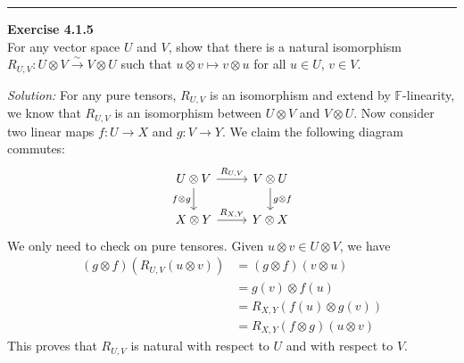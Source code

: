 \documentclass[a4paper, 12pt]{article}
\newenvironment{problem}[2][Exercise]
    { \begin{mdframed}[backgroundcolor=gray!20] \textbf{#1 #2} \\}
    {  \end{mdframed}}
\newenvironment{solution}
    {\textit{Solution:}}
    {}
\begin{document}
\noindent\rule{7in}{2.8pt}
\begin{problem}{4.1.5}
For any vector space \(U\) and \(V\), show that there is a natural isomorphism \(R_{U,V}:U\otimes V\xrightarrow{\sim} V\otimes U\) such that \(u\otimes v\mapsto v\otimes u\) 
for all \(u\in U\), \(v\in V\).
\end{problem}
\begin{solution}
For any pure tensors, \(R_{U,V}\) is an isomorphism and extend by \(\mathbb{F}\)-linearity, we know that \(R_{U,V}\) is an isomorphism between \(U\otimes V\) and \(V\otimes U\). Now consider two linear maps 
\(f:U\rightarrow X\) and \(g:V\rightarrow Y\). We claim the following diagram commutes:
\[\begin{tikzcd}
	{U\otimes V} & {V\otimes U} \\
	{X\otimes Y} & {Y\otimes X}
	\arrow["{R_{U,V}}", from=1-1, to=1-2]
	\arrow["{f\otimes g}"', from=1-1, to=2-1]
	\arrow["{g\otimes f}", from=1-2, to=2-2]
	\arrow["{R_{X,Y}}", from=2-1, to=2-2]
\end{tikzcd}\]
We only need to check on pure tensores. Given \(u\otimes v\in U\otimes V\), we have 
\begin{align*}
	(g\otimes f)(R_{U,V}(u\otimes v)) & =(g\otimes f)(v\otimes u)\\ 
	                                  & =g(v)\otimes f(u)\\ 
									  & =R_{X,Y}(f(u)\otimes g(v))\\ 
									  & =R_{X,Y}(f\otimes g)(u\otimes v)
\end{align*}
This proves that \(R_{U,V}\) is natural with respect to \(U\) and with respect to \(V\).
\end{solution}
\end{document}
